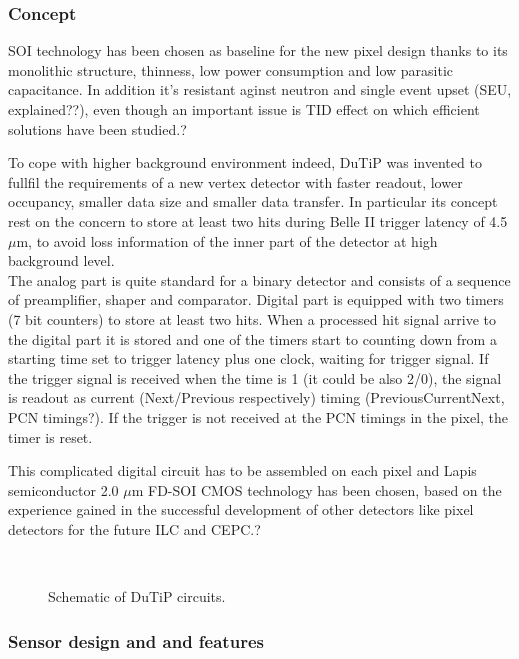 \subsubsection{Concept}

SOI technology has been chosen as baseline for the new pixel design thanks to its monolithic structure, thinness, low power consumption and low parasitic capacitance. In addition it's resistant aginst neutron and single event upset (SEU, explained??), even though an important issue is TID effect on which efficient solutions have been studied.?

To cope with higher background environment indeed, DuTiP was invented to fullfil the requirements of a new vertex detector with faster readout, lower occupancy, smaller data size and smaller data transfer. In particular its concept rest on the concern to store at least two hits during Belle II trigger latency of 4.5 $\mu$m, to avoid loss information of the inner part of the detector at high background level. \\
The analog part is quite standard for a binary detector and consists of a sequence of preamplifier, shaper and comparator. Digital part is equipped with two timers (7 bit counters) to store at least two hits. When a processed hit signal arrive to the digital part it is stored and one of the timers start to counting down from a starting time set to trigger latency plus one clock, waiting for trigger signal. If the trigger signal is received when the time is 1 (it could be also 2/0), the signal is readout as current (Next/Previous respectively) timing (PreviousCurrentNext, PCN timings?). If the trigger is not received at the PCN timings in the pixel, the timer is reset. 

This complicated digital circuit has to be assembled on each pixel and Lapis semiconductor 2.0 $\mu$m FD-SOI CMOS technology has been chosen, based on the experience gained in the successful development of other detectors like pixel detectors for the future ILC and CEPC.?

\begin{figure}[h!]
\centering
{}\quad
{}\\
\caption{Schematic of DuTiP circuits.}
\label{SOI}
\end{figure}

\subsubsection{Sensor design and and features}

